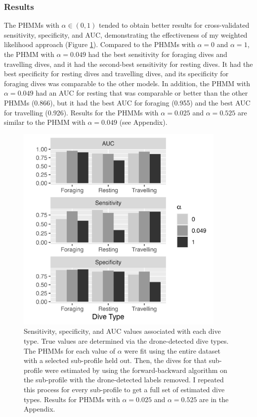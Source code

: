 \subsubsection{Results}

The PHMMs with $\alpha \in (0,1)$ tended to obtain better results for cross-validated sensitivity, specificity, and AUC, demonstrating the effectiveness of my weighted likelihood approach (Figure \ref{fig:sens_spec}). Compared to the PHMMs with $\alpha = 0$ and $\alpha = 1$, the PHMM with $\alpha = 0.049$ had the best sensitivity for foraging dives and travelling dives, and it had the second-best sensitivity for resting dives. It had the best specificity for resting dives and travelling dives, and its specificity for foraging dives was comparable to the other models. In addition, the PHMM with $\alpha = 0.049$ had an AUC for resting that was comparable or better than the other PHMMs (0.866), but it had the best AUC for foraging (0.955) and the best AUC for travelling (0.926). Results for the PHMMs with $\alpha = 0.025$ and $\alpha = 0.525$ are similar to the PHMM with $\alpha = 0.049$ (see Appendix). 

\begin{figure}
    \centering
    \includegraphics[width=4in]{plt/1-1-1-logMDDD_all_model_comparison.png}
    \caption{Sensitivity, specificity, and AUC values associated with each dive type. True values are determined via the drone-detected dive types. The PHMMs for each value of $\alpha$ were fit using the entire dataset with a selected sub-profile held out. Then, the dives for that sub-profile were estimated by using the forward-backward algorithm on the sub-profile with the drone-detected labels removed. I repeated this process for every sub-profile to get a full set of estimated dive types. Results for PHMMs with $\alpha = 0.025$ and $\alpha = 0.525$ are in the Appendix.}
    \label{fig:sens_spec}
\end{figure}

